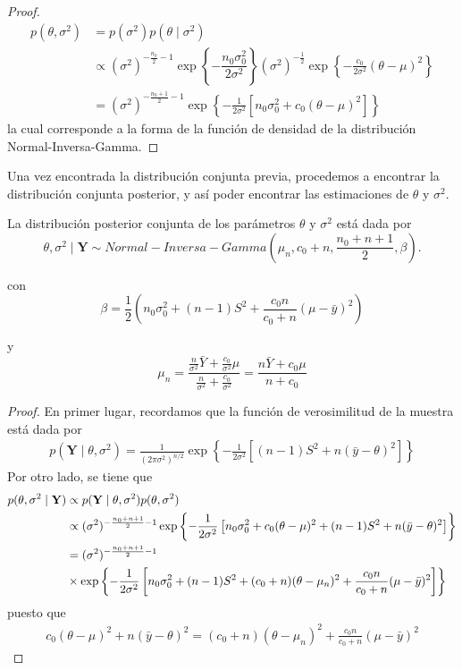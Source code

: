 \begin{proof}
\begin{align*}
p(\theta,\sigma^2)&=p(\sigma^2)p(\theta \mid \sigma^2)\\
&\propto (\sigma^2)^{-\frac{n_0}{2}-1}\exp\left\{-\dfrac{n_0\sigma_0^2}{2\sigma^2}\right\}
(\sigma^2)^{-\frac{1}{2}}\exp\left\{-\frac{c_0}{2\sigma^2}(\theta-\mu)^2\right\}\\
&= (\sigma^2)^{-\frac{n_0+1}{2}-1}\exp\left\{-\frac{1}{2\sigma^2}\left[n_0\sigma^2_0+c_0(\theta-\mu)^2\right]\right\}
\end{align*}
la cual corresponde a la forma de la función de densidad de la distribución Normal-Inversa-Gamma.
\end{proof}

Una vez encontrada la distribución conjunta previa, procedemos a encontrar la distribución conjunta posterior, y así poder encontrar las estimaciones de $\theta$ y $\sigma^2$.
\begin{Res}
La distribución posterior conjunta de los parámetros $\theta$ y $\sigma^2$ está dada por
\begin{equation*}
\theta,\sigma^2\mid\mathbf{Y} \sim Normal-Inversa-Gamma\left(\mu_n, c_0+n, \frac{n_0+n+1}{2},\beta\right).
\end{equation*}

con 
\begin{equation*}
\beta=\dfrac{1}{2}\left(n_0\sigma^2_0+(n-1)S^2+\dfrac{c_0n}{c_0+n}(\mu-\bar{y})^2\right)
\end{equation*}

y
\begin{equation*}
\mu_n=\frac{\frac{n}{\sigma^2}\bar{Y}+\frac{c_0}{\sigma^2}\mu}{\frac{n}{\sigma^2}+\frac{c_0}{\sigma^2}}
=\frac{n\bar{Y}+c_0\mu}{n+c_0}
\end{equation*}
\end{Res}

\begin{proof}
En primer lugar, recordamos que la función de verosimilitud de la muestra está dada por
\begin{align}
p(\mathbf{Y} \mid \theta,\sigma^2)= \frac{1}{(2\pi\sigma^2)^{n/2}}
\exp\left\{-\frac{1}{2\sigma^2}\left[(n-1)S^2+n(\bar{y}-\theta)^2\right]\right\}
\end{align}
Por otro lado, se tiene que
\begin{align}\label{desarro1}
p(\theta,\sigma^2 \mid \mathbf{Y}) & \propto p(\mathbf{Y} \mid \theta,\sigma^2)p(\theta,\sigma^2)\notag\\
&\propto (\sigma^2)^{-\frac{n_0+n+1}{2}-1}
\exp\left\{-\frac{1}{2\sigma^2}\left[n_0\sigma^2_0+c_0(\theta-\mu)^2+(n-1)S^2+n(\bar{y}-\theta)^2\right]\right\}\notag\\
&= (\sigma^2)^{-\frac{n_0+n+1}{2}-1}\\
&\times
\exp\left\{-\frac{1}{2\sigma^2}\left[n_0\sigma^2_0+(n-1)S^2+(c_0+n)(\theta-\mu_n)^2+\frac{c_0n}{c_0+n}(\mu-\bar{y})^2\right]\right\}
\end{align}
puesto que
\begin{align*}
c_0(\theta-\mu)^2+n(\bar{y}-\theta)^2=(c_0+n)(\theta-\mu_n)^2+\frac{c_0n}{c_0+n}(\mu-\bar{y})^2
\end{align*}
\end{proof}

